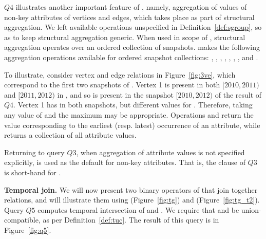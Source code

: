 $Q4$ illustrates another important feature of \ql, namely, aggregation
of values of non-key attributes of vertices and edges, which takes
place as part of structural aggregation.  We left available operations
unspecified in Definition~\ref{def:sgroup}, so as to keep structural
aggregation generic.
%
When used in scope of , structural aggregation operates
over an ordered collection of snapshots.  \ql makes the following
aggregation operations available for ordered snapshot collections:
, , , , ,
, , and .

To illustrate, consider vertex and edge relations in
Figure~\ref{fig:3ve}, which correspond to the first two snapshots of
.  Vertex 1 is present in both $[2010, 2011)$ and $[2011,
    2012)$ in , and so is present in the snapshot $[2010,
      2012)$ of the result of $Q4$.  Vertex 1 has 
      in both snapshots, but different values for .
      Therefore, taking any value of  and the maximum
       may be appropriate.  Operations  and
       return the value corresponding to the earliest
      (resp. latest) occurrence of an attribute, while 
      returns a collection of all attribute values.

Returning to query $Q3$, when aggregation of attribute values is not
specified explicitly,  is used as the default for non-key
attributes.  That is, the  clause of $Q3$ is short-hand
for  
.


{\bf Temporal join.} We will now present two binary operators of \ql
that join together \tg relations, and will illustrate them using
 (Figure~\ref{fig:tg}) and 
(Figure~\ref{fig:tg_t2}).  Query $Q5$ computes temporal intersection
of  and .  We require that  and
 be union-compatible, as per Definition~\ref{def:tuc}.  The
result of this query is in Figure~\ref{fig:q5}. 


